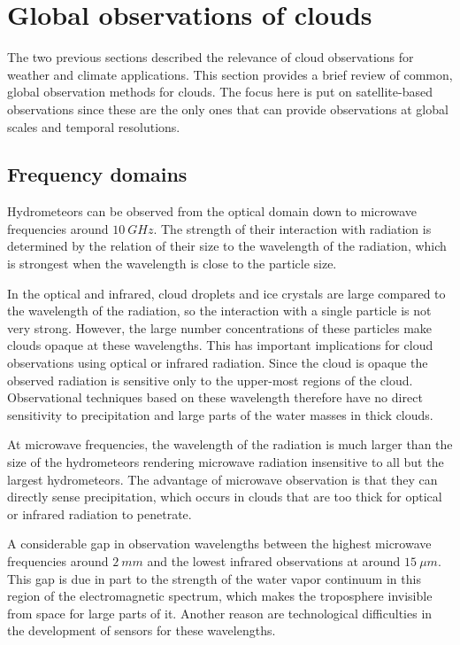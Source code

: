 \section{Global observations of clouds}

The two previous sections described the relevance of cloud observations for
weather and climate applications. This section provides a brief review of
common, global observation methods for clouds. The focus here is put on
satellite-based observations since these are the only ones that can provide
observations at global  scales and temporal resolutions. 

\subsection{Frequency domains}

Hydrometeors can be observed from the optical domain down to microwave frequencies
around $10\ \unit{GHz}$. The strength of their interaction with radiation is determined
by the relation of their size to the wavelength of the radiation, which is strongest
when the wavelength is close to the particle size.

In the optical and infrared, cloud droplets and ice crystals are large compared
to the wavelength of the radiation, so the interaction with a single particle is
not very strong. However, the large number concentrations of these particles
make clouds opaque at these wavelengths. This has important implications for
cloud observations using optical or infrared radiation. Since the cloud is
opaque the observed radiation is sensitive only to the upper-most regions of the
cloud. Observational techniques based on these wavelength therefore have no
direct sensitivity to precipitation and large parts of the water masses in thick
clouds.

At microwave frequencies, the wavelength of the radiation is much larger than
the size of the hydrometeors rendering microwave radiation insensitive to all
but the largest hydrometeors. The advantage of microwave observation is that
they can directly sense precipitation, which occurs in clouds that are too thick
for optical or infrared radiation to penetrate.

A considerable gap in observation wavelengths between the highest microwave
frequencies around $2\ \unit{mm}$ and the lowest infrared observations at
around $15\ \unit{\mu m}$. This gap is due in part to the strength of the
water vapor continuum in this region of the electromagnetic spectrum, which 
makes the troposphere invisible from space for large parts of it. Another reason
are technological difficulties in the development of sensors for these wavelengths.

